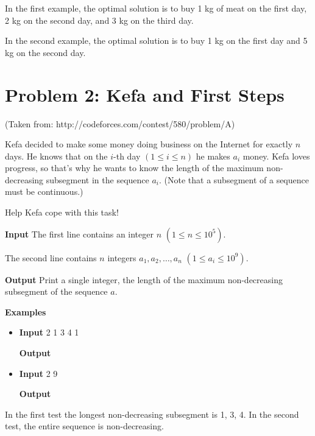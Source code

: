 \normalfont\documentclass[letterpaper,11pt]{article}
\begin{document}
In the first example, the optimal solution is to buy 1 kg of meat on the first day, 2 kg on the second day, and 3 kg on the third day.

In the second example, the optimal solution is to buy 1 kg on the first day and 5 kg on the second day.

\newpage

\section*{Problem 2: Kefa and First Steps}
(Taken from: http://codeforces.com/contest/580/problem/A)

Kefa decided to make some money doing business on the Internet for exactly $n$ days. He knows that on the $i$-th day $(1 \leq i \leq n)$ he makes $a_i$ money. Kefa loves progress, so that's why he wants to know the length of the maximum non-decreasing subsegment in the sequence $a_i$. (Note that a subsegment of a sequence must be continuous.)

Help Kefa cope with this task!

\textbf{Input} \newline
The first line contains an integer $n$ $(1 \leq n \leq 10^5)$.

The second line contains $n$ integers $a_1, a_2, \ldots, a_n$ $(1 \leq a_i \leq 10^9)$.

\textbf{Output} \newline
Print a single integer, the length of the maximum non-decreasing subsegment of the sequence $a$. \newline

\textbf{Examples}
\begin{itemize}
\item \textbf{Input}   2 1 3 4 1

\textbf{Output} 

\item \textbf{Input}   2 9

\textbf{Output}  \newline
\end{itemize}

In the first test the longest non-decreasing subsegment is 1, 3, 4. In the second test, the entire sequence is non-decreasing.
\end{document}
